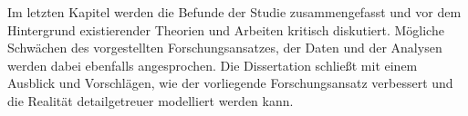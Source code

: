 \documentclass[a4paper]{article}
\begin{document}
Im letzten Kapitel werden die Befunde der Studie zusammengefasst und vor dem Hintergrund existierender Theorien und Arbeiten kritisch diskutiert. M\"ogliche Schw\"achen des vorgestellten Forschungsansatzes, der Daten und der Analysen werden dabei ebenfalls angesprochen. Die Dissertation schlie\ss t mit einem Ausblick und Vorschl\"agen, wie der vorliegende Forschungsansatz verbessert und die Realit\"at detailgetreuer modelliert werden kann.
%
%
%
\end{document}
